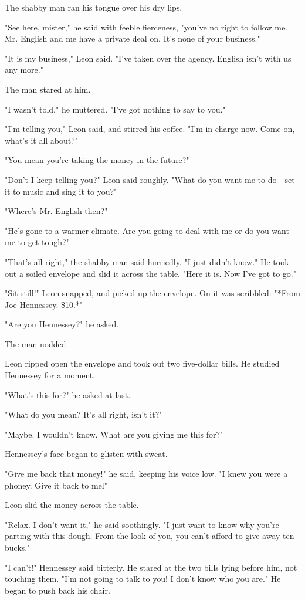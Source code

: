 \documentclass{novel}
\begin{document}
The shabby man ran his tongue over his dry lips.

"See here, mister," he said with feeble fierceness, "you've no right to follow me. Mr. English and me have a private deal on. It's none of your business."

"It is my business," Leon said. "I've taken over the agency. English isn't with us any more."

The man stared at him.

"I wasn't told," he muttered. "I've got nothing to say to you."

"I'm telling you," Leon said, and stirred his coffee. "I'm in charge now. Come on, what's it all about?"

"You mean you're taking the money in the future?"

"Don't I keep telling you?" Leon said roughly. "What do you want me to do—set it to music and sing it to you?"

"Where's Mr. English then?"

"He's gone to a warmer climate. Are you going to deal with me or do you want me to get tough?"

"That's all right," the shabby man said hurriedly. "I just didn't know." He took out a soiled envelope and slid it across the table. "Here it is. Now I've got to go."

"Sit still!" Leon snapped, and picked up the envelope. On it was scribbled: "*From Joe Hennessey. \$10.*"

"Are you Hennessey?" he asked.

The man nodded.

Leon ripped open the envelope and took out two five-dollar bills. He studied Hennessey for a moment.

"What's this for?" he asked at last.

"What do you mean? It's all right, isn't it?"

"Maybe. I wouldn't know. What are you giving me this for?"

Hennessey's face began to glisten with sweat.

"Give me back that money!" he said, keeping his voice low. "I knew you were a phoney. Give it back to mel"

Leon slid the money across the table.

"Relax. I don't want it," he said soothingly. "I just want to know why you're parting with this dough. From the look of you, you can't afford to give away ten bucks."

"I can't!" Hennessey said bitterly. He stared at the two bills lying before him, not touching them. "I'm not going to talk to you! I don't know who you are." He began to push back his chair.
\end{document}
